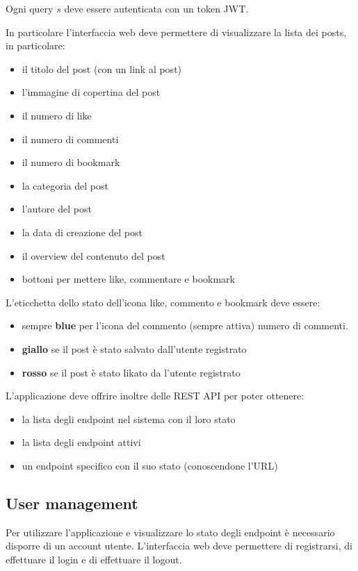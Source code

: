 \documentclass{article}
\begin{document}
Ogni query $s$ deve essere autenticata con un token JWT.

In particolare l'interfaccia web deve permettere di visualizzare
la lista dei posts, in particolare:
\begin{itemize}
    \item il titolo del post (con un link al post)
    \item l'immagine di copertina del post
    \item il numero di like
    \item il numero di commenti
    \item il numero di bookmark
    \item la categoria del post
    \item l'autore del post
    \item la data di creazione del post
    \item il overview del contenuto del post
    \item bottoni per mettere like, commentare e bookmark
\end{itemize}

L'eticchetta dello stato dell'icona like, commento e bookmark deve essere:
\begin{itemize}
    \item sempre \textbf{blue} per l'icona del commento (sempre attiva) numero di commenti.
    \item \textbf{giallo} se il post è stato salvato dall'utente registrato
    \item \textbf{rosso} se il post è stato likato da l'utente registrato
\end{itemize}

L'applicazione deve offrire inoltre delle REST API per poter ottenere:
\begin{itemize}
    \item la lista degli endpoint nel sistema con il loro stato
    \item la lista degli endpoint attivi
    \item un endpoint specifico con il suo stato (conoscendone l'URL)
\end{itemize}

\subsection{User management}

Per utilizzare l'applicazione e visualizzare lo stato degli endpoint è necessario disporre di un account utente.
L'interfaccia web deve permettere di registrarsi, di effettuare il login e di effettuare il logout.
\end{document}
